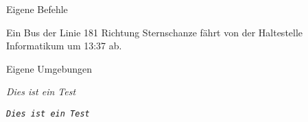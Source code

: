 \documentclass{beamer}
\begin{document}
		
		\begin{frame}[containsverbatim]{Eigene Befehle}
			\begin{latexcode}
\newcommand{\bus}[4]{Ein Bus der Linie #1 Richtung 
                    #2 fährt von der Haltestelle
                    #3 um #4 ab.}
\bus{181}{Sternschanze}{Informatikum}{13:37}
			\end{latexcode}
		\end{frame}
		
		
		\begin{frame}[containsverbatim]{Eigene Umgebungen}
			\begin{latexcode}
\newenvironment{textttit}
               {\begingroup\ttfamily\itshape}
               {\endgroup}
\begin{textttit}
	Dies ist ein Test
\end{textttit}
			\end{latexcode}
			\texttt{\textit{Dies ist ein Test}}
		\end{frame}
		
		
%		


		\section{\protect\TikZ}
		
\end{document}
